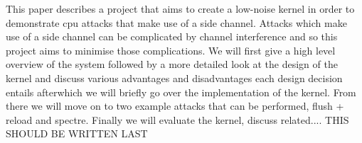 This paper describes a project that aims to create a low-noise kernel in order to demonstrate cpu attacks that make use of a side channel. Attacks which make use of a side channel can be complicated by channel interference and so this project aims to minimise those complications.
We will first give a high level overview of the system followed by a more detailed look at the design of the kernel and discuss various advantages and disadvantages each design decision entails afterwhich we will briefly go over the implementation of the kernel. From there we will move on to two example attacks that can be performed, flush + reload and spectre. Finally we will evaluate the kernel, discuss related.... THIS SHOULD BE WRITTEN LAST 

